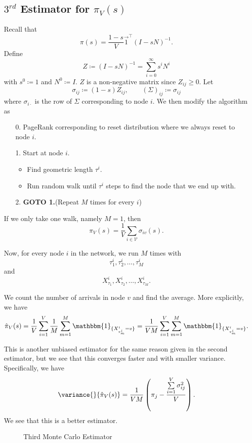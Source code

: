 \subsection{\(3^{rd}\) Estimator for \(\pi_V(s)\)}
Recall that
\[
	\pi(s) = \frac{1 - s}{V}\vec{1}^{\top} (I - sN)^{-1}.
\]
Define
\[
	Z \coloneqq (I - sN)^{-1} = \sum\limits_{i=0}^{\infty} s^i N^i
\]
with \(s^0\coloneqq 1\) and \(N^0\coloneqq I\). \(Z\) is a non-negative matrix since \(Z_{ij}\geq 0\).
Let
\[
	\sigma_{ij}\coloneqq (1 - s)Z_{ij} , \qquad \left(\Sigma\right)_{ij}\coloneqq \sigma_{ij}
\]
where \(\sigma_{i\cdot}\) is the row of \(\Sigma\) corresponding to node \(i\). We then modify the algorithm as
\begin{enumerate}
	\item[0.] PageRank corresponding to reset distribution where we always reset to node \(i\).
	\item[1.] Start at node \(i\).
		\begin{itemize}
			\item Find geometric length \(\tau^i\).
			\item Run random walk until \(\tau^i\) steps to find the node that we end up with.
		\end{itemize}
	\item[2.] \textbf{GOTO 1.}(Repeat \(M\) times for every \(i\))
\end{enumerate}

If we only take one walk, namely \(M = 1\), then
\[
	\pi_V(s) = \frac{1}{V}\sum\limits_{i\in\mathcal{V}}\sigma_{iv}(s).
\]

Now, for every node \(i\) in the network, we run \(M\) times with
\[
	\tau^i_1, \tau^i_2, \ldots , \tau^i_M
\]
and
\[
	X_{\tau_1}^i, X_{\tau_2}^i, \ldots , X_{\tau_M}^i.
\]

We count the number of arrivals in node \(v\) and find the average. More explicitly, we have
\[
	\hat{\pi}_V(s) = \frac{1}{V}\sum\limits_{i=1}^{V} \frac{1}{M}\sum\limits_{m=1}^{M} \mathbbm{1}_{\{X^i_{\tau^i_m} = v\}} = \frac{1}{VM}\sum\limits_{i=1}^{V} \sum\limits_{m=1}^{M} \mathbbm{1}_{\{X^i_{\tau^i_m} = v\}} .
\]

This is another unbiased estimator for the same reason given in the second estimator, but we see that this converges faster and with smaller variance. Specifically, we have
\[
	\variance{}{\hat{\pi}_V(s)} = \frac{1}{VM}\left(\pi_{j} - \frac{\sum\limits_{i=1}^{V} \sigma_{ij}^2}{V}\right).
\]
We see that this is a better estimator.

\begin{figure}[H]
	\centering
	\caption{Third Monte Carlo Estimator}
	\label{fig:Monte-Carlo-Estimator-3}
\end{figure}